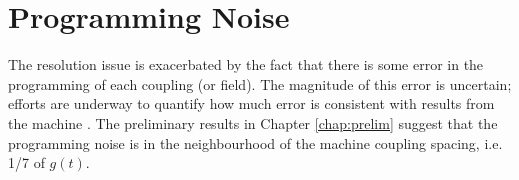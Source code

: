 \section{Programming Noise}
\label{sec:noise}
The resolution issue is exacerbated by the fact that there is some error in the programming of each coupling (or field).  The magnitude of this error is uncertain; efforts are underway to quantify how much error is consistent with results from the machine \cite{aaron}.
The preliminary results in Chapter \ref{chap:prelim} suggest that the programming noise is in the neighbourhood of the machine coupling spacing, i.e. 1/7 of $g(t)$.
